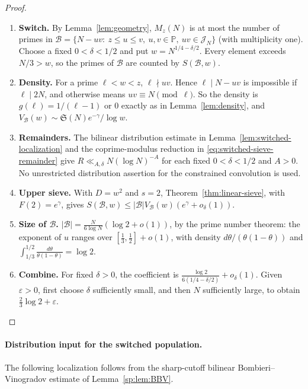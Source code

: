 \documentclass[final,11pt]{elsarticle}
\theoremstyle{definition}
\theoremstyle{remark}
\newcommand{\PP}{\mathbb{P}}
\newcommand{\Sg}{\mathfrak{S}}
\newcommand{\eps}{\varepsilon}
\newcommand{\cband}{\mathcal{J}_N}
\numberwithin{equation}{section}
\begin{document}
\begin{proof}
\begin{enumerate}
\item \textbf{Switch.} By Lemma~\ref{lem:geometry}, $M_z(N)$ is at most the number of primes in $\mathcal B=\{N-uv:\ z\le u\le v,\ u,v\in\PP,\ uv\in\cband\}$ (with multiplicity one). Choose a fixed $0<\delta<1/2$ and put $w=N^{1/4-\delta/2}$. Every element exceeds $N/3>w$, so the primes of $\mathcal B$ are counted by $S(\mathcal B,w)$.
\item \textbf{Density.} For a prime $\ell<w<z$, $\ell\nmid uv$. Hence $\ell\mid N-uv$ is impossible if $\ell\mid 2N$, and otherwise means $uv\equiv N\pmod\ell$. So the density is $g(\ell)=1/(\ell-1)$ or $0$ exactly as in Lemma~\ref{lem:density}, and $V_{\mathcal B}(w)\sim\Sg(N)e^{-\gamma}/\log w$.
\item \textbf{Remainders.} The bilinear distribution estimate in Lemma~\ref{lem:switched-localization} and the coprime-modulus reduction in \eqref{eq:switched-sieve-remainder} give $R\ll_{A,\delta}N(\log N)^{-A}$ for each fixed $0<\delta<1/2$ and $A>0$. No unrestricted distribution assertion for the constrained convolution is used.
\item \textbf{Upper sieve.} With $D=w^2$ and $s=2$, Theorem~\ref{thm:linear-sieve}, with $F(2)=e^\gamma$, gives $S(\mathcal B,w)\le|\mathcal B|V_{\mathcal B}(w)(e^\gamma+o_{\delta}(1))$.
\item \textbf{Size of $\mathcal B$.} $|\mathcal B|=\frac{N}{6\log N}(\log2+o(1))$, by the prime number theorem: the exponent of $u$ ranges over $[\frac13,\frac12]+o(1)$, with density $d\theta/(\theta(1-\theta))$ and $\int_{1/3}^{1/2}\frac{d\theta}{\theta(1-\theta)}=\log2$.
\item \textbf{Combine.} For fixed $\delta>0$, the coefficient is $\frac{\log2}{6(1/4-\delta/2)}+o_{\delta}(1)$. Given $\eps>0$, first choose $\delta$ sufficiently small, and then $N$ sufficiently large, to obtain $\tfrac23\log2+\eps$. \qedhere
\end{enumerate}
\end{proof}

\paragraph{Distribution input for the switched population.}
The following localization follows from the sharp-cutoff bilinear
Bombieri--Vinogradov estimate of Lemma~\ref{sp:lem:BBV}.
\end{document}
